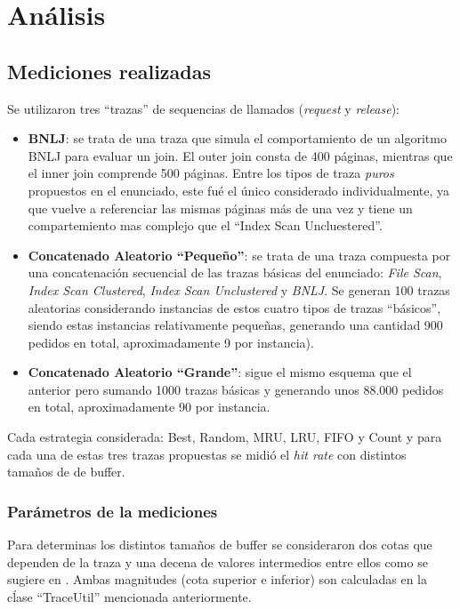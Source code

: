 \section{An\'alisis}

\subsection{Mediciones realizadas}
Se utilizaron tres ``trazas'' de sequencias de llamados (\textit{request} y \textit{release}):   
\begin{itemize}
\item \textbf{BNLJ}: se trata de una traza que simula el comportamiento de un algoritmo BNLJ para evaluar un join. 
El outer join consta de 400 p\'aginas, mientras que el inner join comprende 500 p\'aginas. 
Entre los tipos de traza \textit{puros} propuestos en el enunciado, este fu\'e el \'unico considerado individualmente, 
ya que vuelve a referenciar las mismas p\'aginas m\'as de una vez y tiene un compartemiento mas complejo que 
el ``Index Scan Uncluestered''. 
\item \textbf{Concatenado Aleatorio ``Peque\~no''}: se trata de una traza compuesta por una concatenaci\'on secuencial de 
las trazas b\'asicas del enunciado: \textit{File Scan}, \textit{Index Scan Clustered}, \textit{Index Scan Unclustered} 
y \textit{BNLJ}. Se generan 100 trazas aleatorias considerando instancias de estos cuatro tipos de trazas ``b\'asicos'',
siendo estas instancias relativamente pequeñas, generando una cantidad 900 pedidos en total, aproximadamente 9 por instancia). 
\item \textbf{Concatenado Aleatorio ``Grande''}: sigue el mismo esquema que el anterior pero sumando 1000 trazas b\'asicas y
generando unos 88.000 pedidos en total, aproximadamente 90 por instancia.
\end{itemize}

Cada estrategia considerada: Best, Random, MRU, LRU, FIFO y Count y para cada una de estas tres trazas propuestas se
midi\'o el \textit{hit rate} con distintos tama\~nos de de buffer. 

\subsubsection{Par\'ametros de la mediciones}
Para determinas los distintos tama\~nos de buffer se consideraron dos cotas que dependen de la traza y una decena de valores
intermedios entre ellos como se sugiere en \cite{eff84}. Ambas magnitudes (cota superior e inferior) son calculadas en la cĺase ``TraceUtil''
mencionada anteriormente.

